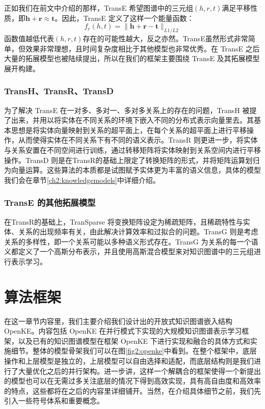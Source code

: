        正如我们在前文中介绍的那样，TransE \cite{bordes2013translating} 希望图谱中的三元组$(h, r, t)$满足平移性质，即$\mathbf{h} + \mathbf{r} \approx \mathbf{t}$。因此，TransE 定义了这样一个能量函数：
        \begin{equation}
        f_{r}(h, t) = \lVert \mathbf{h} + \mathbf{r} - \mathbf{t} \rVert_{L1/L2}
        \end{equation}
       函数值越低代表$(h, r, t)$存在的可能性越大，反之亦然。TransE虽然形式非常简单，但效果非常理想，且时间复杂度相比于其他模型也非常优秀。在 TransE 之后大量的拓展模型也被陆续提出，所以在我们的框架主要围绕 TransE 及其拓展模型展开构建。

      \subsubsection{TransH、TransR、TransD}

      为了解决 TransE 在一对多、多对一、多对多关系上的存在的问题，TransH \cite{wang2014knowledge}被提了出来，并用以将实体在不同关系的环境下嵌入不同的分布式表示向量里去。其基本思想是将实体向量映射到关系的超平面上，在每个关系的超平面上进行平移操作，从而使得实体在不同关系下有不同的语义表示。TransR 则更进一步，将实体与关系安置在不同空间进行训练，通过转移矩阵将实体映射到关系空间内进行平移操作。TransD 则是在TransR的基础上限定了转换矩阵的形式，并将矩阵运算划归为向量运算。这些算法的本质都是试图赋予实体更为丰富的语义信息，具体的模型我们会在章节\ref{ch2:knowledgemodels}中详细介绍。

      \subsubsection{TransE 的其他拓展模型}

      在TransR的基础上，TranSparse \cite{ji2016knowledge} 将变换矩阵设定为稀疏矩阵，且稀疏特性与实体、关系的出现频率有关，由此解决计算效率和过拟合的问题。TransG \cite{xiao2015transg} 则是考虑关系的多样性，即一个关系可能以多种语义形式存在。TransG 为关系的每一个语义都定义了一个高斯分布表示，并且使用高斯混合模型来对知识图谱中的三元组进行表示学习。


\section{算法框架}

在这一章节内容里，我们主要介绍我们设计出的开放式知识图谱嵌入结构 OpenKE。内容包括 OpenKE 在并行模式下实现的大规模知识图谱表示学习框架，以及已有的知识图谱模型在框架 OpenKE 下进行实现和融合的具体方式和实施细节。整体的模型骨架我们可以在图\ref{fig2:openke}中看到。在整个框架中，底层操作和上层模型是独立的，上层模型可以自由选择和适配，而底层结构则是我们进行了大量优化之后的并行架构。进一步讲，这样一个解耦合的框架使得一个新提出的模型也可以在无需过多关注底层的情况下得到高效实现，具有高自由度和高效率的特点，这些都将在之后的内容里详细铺开。当然，在介绍具体细节之前，我们先引入一些符号体系和重要概念。

